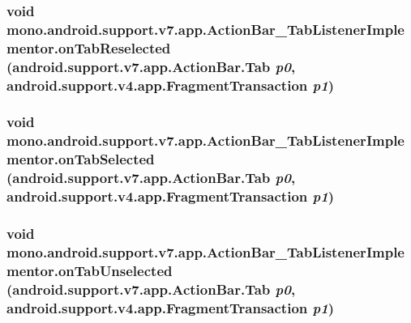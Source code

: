 \hypertarget{classmono_1_1android_1_1support_1_1v7_1_1app_1_1_action_bar___tab_listener_implementor_6b35cb09703a4c23539a8e4396b9c863}{
\subsubsection[{onTabReselected}]{\setlength{\rightskip}{0pt plus 5cm}void mono.android.support.v7.app.ActionBar\_\-TabListenerImplementor.onTabReselected (android.support.v7.app.ActionBar.Tab {\em p0}, \/  android.support.v4.app.FragmentTransaction {\em p1})}}
\label{classmono_1_1android_1_1support_1_1v7_1_1app_1_1_action_bar___tab_listener_implementor_6b35cb09703a4c23539a8e4396b9c863}


\hypertarget{classmono_1_1android_1_1support_1_1v7_1_1app_1_1_action_bar___tab_listener_implementor_aff79de08cbe6639362e13d59b7e4e4a}{
\subsubsection[{onTabSelected}]{\setlength{\rightskip}{0pt plus 5cm}void mono.android.support.v7.app.ActionBar\_\-TabListenerImplementor.onTabSelected (android.support.v7.app.ActionBar.Tab {\em p0}, \/  android.support.v4.app.FragmentTransaction {\em p1})}}
\label{classmono_1_1android_1_1support_1_1v7_1_1app_1_1_action_bar___tab_listener_implementor_aff79de08cbe6639362e13d59b7e4e4a}


\hypertarget{classmono_1_1android_1_1support_1_1v7_1_1app_1_1_action_bar___tab_listener_implementor_f68d830015bf6da6d2dc1ae38e124dd6}{
\subsubsection[{onTabUnselected}]{\setlength{\rightskip}{0pt plus 5cm}void mono.android.support.v7.app.ActionBar\_\-TabListenerImplementor.onTabUnselected (android.support.v7.app.ActionBar.Tab {\em p0}, \/  android.support.v4.app.FragmentTransaction {\em p1})}}
\label{classmono_1_1android_1_1support_1_1v7_1_1app_1_1_action_bar___tab_listener_implementor_f68d830015bf6da6d2dc1ae38e124dd6}




